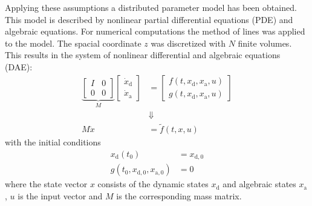 \documentclass[pdftex,a4paper, 12pt]{article}
\begin{document}
%
%
%
Applying these assumptions a distributed parameter model has been obtained. This model is described by nonlinear partial differential equations (PDE) and algebraic equations. For numerical computations the method of lines was applied to the model. The spacial coordinate $z$ was discretized with $N$ finite volumes. This results in the system of nonlinear differential and algebraic equations (DAE):
%
\begin{align}
	\underbrace{\begin{bmatrix} I & 0 \\ 0 & 0 \end{bmatrix}}_{M} \begin{bmatrix} \dot x_{\mathrm{d}} \\ \dot x_{\mathrm{a}} \end{bmatrix} &= \begin{bmatrix}  f(t, 	x_{\mathrm{d}}, x_{\mathrm{a}}, u) \\  g(t, x_{\mathrm{d}}, x_{\mathrm{a}}, u) \end{bmatrix}  
	\label{eq:DAE_sys} \\
	&\Downarrow \nonumber \\
	M \dot{x} &= \tilde{f}(t,x,u) \nonumber
\end{align}
%
with the initial conditions
%
\begin{align}
	x_{\mathrm{d}}(t_0) &= x_{\mathrm{d,0}} 
	\label{eq:DAE_sys_0} \\ 
	g(t_0, x_{\mathrm{d,0}}, x_{\mathrm{a,0}}) &= 0 \nonumber	
\end{align}
%
where the state vector $x$ consists of the dynamic states $x_{\mathrm{d}}$ and algebraic states $x_{\mathrm{a}}$, $u$ is the input vector and $M$ is the corresponding mass matrix.
%
\par
%
%
%
\end{document}
